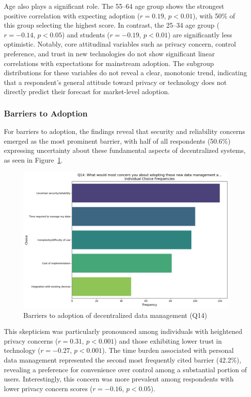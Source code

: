 		Age also plays a significant role. The 55--64 age group shows the strongest positive correlation with expecting adoption ($r = 0.19$, $p < 0.01$), with 50\% of this group selecting the highest score. In contrast, the 25--34 age group ($r = -0.14$, $p < 0.05$) and students ($r = -0.19$, $p < 0.01$) are significantly less optimistic.
		Notably, core attitudinal variables such as privacy concern, control preference, and trust in new technologies do not show significant linear correlations with expectations for mainstream adoption. The subgroup distributions for these variables do not reveal a clear, monotonic trend, indicating that a respondent's general attitude toward privacy or technology does not directly predict their forecast for market-level adoption.
	\subsubsection{Barriers to Adoption}
		For barriers to adoption, the findings reveal that security and reliability concerns emerged as the most prominent barrier, with half of all respondents (50.6\%) expressing uncertainty about these fundamental aspects of decentralized systems, as seen in Figure~\ref{fig:Q14_barriers}. 
		\begin{figure}[ht]\centering
			\includegraphics[width=1\linewidth]{figures/questions/Q14_multiple_choice.png}
			\caption{Barriers to adoption of decentralized data management (Q14)}
			\label{fig:Q14_barriers}
		\end{figure}
		This skepticism was particularly pronounced among individuals with heightened privacy concerns ($r = 0.31$, $p < 0.001$) and those exhibiting lower trust in technology ($r = -0.27$, $p < 0.001$).
		The time burden associated with personal data management represented the second most frequently cited barrier (42.2\%), revealing a preference for convenience over control among a substantial portion of users. Interestingly, this concern was more prevalent among respondents with lower privacy concern scores ($r = -0.16$, $p < 0.05$).
